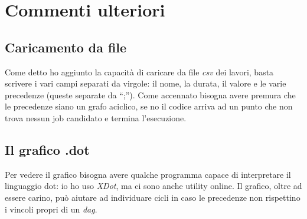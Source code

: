 \documentclass[12pt, letterpaper]{article}
\begin{document}
\section{Commenti ulteriori}

\subsection{Caricamento da file}
Come detto ho aggiunto la capacità di caricare da file \textit{csv} dei lavori, basta scrivere i vari campi separati da virgole: il nome, la durata, il valore e le varie precedenze (queste separate da ``;'').
Come accennato bisogna avere premura che le precedenze siano un grafo aciclico, se no il codice arriva ad un punto che non trova nessun job candidato e termina l'esecuzione.
\subsection{Il grafico .dot}
Per vedere il grafico bisogna avere qualche programma capace di interpretare il linguaggio dot: io ho uso \textit{XDot}, ma ci sono anche utility online.
Il grafico, oltre ad essere carino, può aiutare ad individuare cicli in caso le precedenze non rispettino i vincoli propri di un \textit{dag}.

\printbibliography
\end{document}
